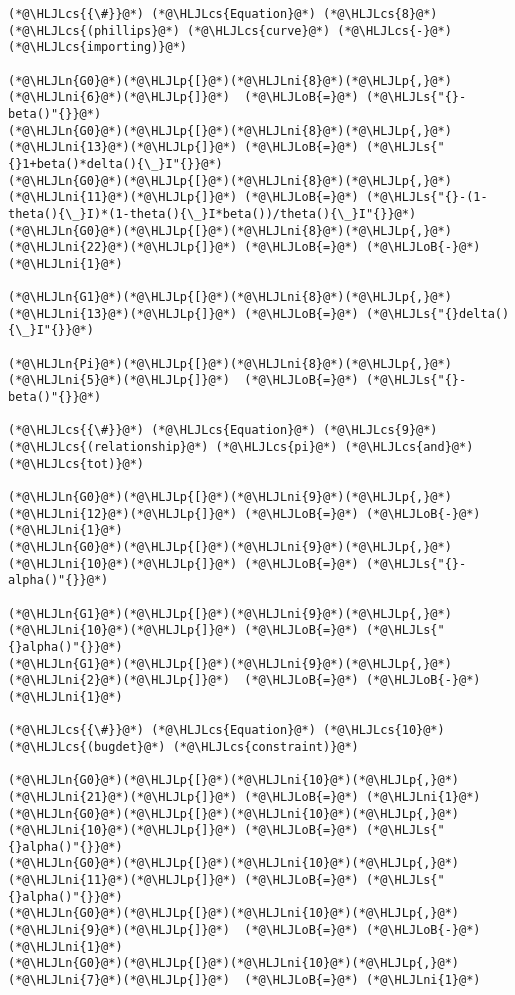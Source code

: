 \documentclass[12pt,a4paper]{article}
\newcommand{\HLJLn}[1]{#1}
\newcommand{\HLJLs}[1]{\textcolor[RGB]{201,61,57}{#1}}
\newcommand{\HLJLni}[1]{\textcolor[RGB]{59,151,46}{#1}}
\newcommand{\HLJLoB}[1]{\textcolor[RGB]{102,102,102}{\textbf{#1}}}
\newcommand{\HLJLp}[1]{#1}
\newcommand{\HLJLcs}[1]{\textcolor[RGB]{153,153,119}{\textit{#1}}}
\begin{document}
\begin{lstlisting}
(*@\HLJLcs{{\#}}@*) (*@\HLJLcs{Equation}@*) (*@\HLJLcs{8}@*)  (*@\HLJLcs{(phillips}@*) (*@\HLJLcs{curve}@*) (*@\HLJLcs{-}@*) (*@\HLJLcs{importing)}@*)

(*@\HLJLn{G0}@*)(*@\HLJLp{[}@*)(*@\HLJLni{8}@*)(*@\HLJLp{,}@*)(*@\HLJLni{6}@*)(*@\HLJLp{]}@*)  (*@\HLJLoB{=}@*) (*@\HLJLs{"{}-beta()"{}}@*)
(*@\HLJLn{G0}@*)(*@\HLJLp{[}@*)(*@\HLJLni{8}@*)(*@\HLJLp{,}@*)(*@\HLJLni{13}@*)(*@\HLJLp{]}@*) (*@\HLJLoB{=}@*) (*@\HLJLs{"{}1+beta()*delta(){\_}I"{}}@*)
(*@\HLJLn{G0}@*)(*@\HLJLp{[}@*)(*@\HLJLni{8}@*)(*@\HLJLp{,}@*)(*@\HLJLni{11}@*)(*@\HLJLp{]}@*) (*@\HLJLoB{=}@*) (*@\HLJLs{"{}-(1-theta(){\_}I)*(1-theta(){\_}I*beta())/theta(){\_}I"{}}@*)
(*@\HLJLn{G0}@*)(*@\HLJLp{[}@*)(*@\HLJLni{8}@*)(*@\HLJLp{,}@*)(*@\HLJLni{22}@*)(*@\HLJLp{]}@*) (*@\HLJLoB{=}@*) (*@\HLJLoB{-}@*)(*@\HLJLni{1}@*)

(*@\HLJLn{G1}@*)(*@\HLJLp{[}@*)(*@\HLJLni{8}@*)(*@\HLJLp{,}@*)(*@\HLJLni{13}@*)(*@\HLJLp{]}@*) (*@\HLJLoB{=}@*) (*@\HLJLs{"{}delta(){\_}I"{}}@*)

(*@\HLJLn{Pi}@*)(*@\HLJLp{[}@*)(*@\HLJLni{8}@*)(*@\HLJLp{,}@*)(*@\HLJLni{5}@*)(*@\HLJLp{]}@*)  (*@\HLJLoB{=}@*) (*@\HLJLs{"{}-beta()"{}}@*)

(*@\HLJLcs{{\#}}@*) (*@\HLJLcs{Equation}@*) (*@\HLJLcs{9}@*) (*@\HLJLcs{(relationship}@*) (*@\HLJLcs{pi}@*) (*@\HLJLcs{and}@*) (*@\HLJLcs{tot)}@*)

(*@\HLJLn{G0}@*)(*@\HLJLp{[}@*)(*@\HLJLni{9}@*)(*@\HLJLp{,}@*)(*@\HLJLni{12}@*)(*@\HLJLp{]}@*) (*@\HLJLoB{=}@*) (*@\HLJLoB{-}@*)(*@\HLJLni{1}@*)
(*@\HLJLn{G0}@*)(*@\HLJLp{[}@*)(*@\HLJLni{9}@*)(*@\HLJLp{,}@*)(*@\HLJLni{10}@*)(*@\HLJLp{]}@*) (*@\HLJLoB{=}@*) (*@\HLJLs{"{}-alpha()"{}}@*)

(*@\HLJLn{G1}@*)(*@\HLJLp{[}@*)(*@\HLJLni{9}@*)(*@\HLJLp{,}@*)(*@\HLJLni{10}@*)(*@\HLJLp{]}@*) (*@\HLJLoB{=}@*) (*@\HLJLs{"{}alpha()"{}}@*)
(*@\HLJLn{G1}@*)(*@\HLJLp{[}@*)(*@\HLJLni{9}@*)(*@\HLJLp{,}@*)(*@\HLJLni{2}@*)(*@\HLJLp{]}@*)  (*@\HLJLoB{=}@*) (*@\HLJLoB{-}@*)(*@\HLJLni{1}@*)

(*@\HLJLcs{{\#}}@*) (*@\HLJLcs{Equation}@*) (*@\HLJLcs{10}@*) (*@\HLJLcs{(bugdet}@*) (*@\HLJLcs{constraint)}@*)

(*@\HLJLn{G0}@*)(*@\HLJLp{[}@*)(*@\HLJLni{10}@*)(*@\HLJLp{,}@*)(*@\HLJLni{21}@*)(*@\HLJLp{]}@*) (*@\HLJLoB{=}@*) (*@\HLJLni{1}@*)
(*@\HLJLn{G0}@*)(*@\HLJLp{[}@*)(*@\HLJLni{10}@*)(*@\HLJLp{,}@*)(*@\HLJLni{10}@*)(*@\HLJLp{]}@*) (*@\HLJLoB{=}@*) (*@\HLJLs{"{}alpha()"{}}@*)
(*@\HLJLn{G0}@*)(*@\HLJLp{[}@*)(*@\HLJLni{10}@*)(*@\HLJLp{,}@*)(*@\HLJLni{11}@*)(*@\HLJLp{]}@*) (*@\HLJLoB{=}@*) (*@\HLJLs{"{}alpha()"{}}@*)
(*@\HLJLn{G0}@*)(*@\HLJLp{[}@*)(*@\HLJLni{10}@*)(*@\HLJLp{,}@*)(*@\HLJLni{9}@*)(*@\HLJLp{]}@*)  (*@\HLJLoB{=}@*) (*@\HLJLoB{-}@*)(*@\HLJLni{1}@*)
(*@\HLJLn{G0}@*)(*@\HLJLp{[}@*)(*@\HLJLni{10}@*)(*@\HLJLp{,}@*)(*@\HLJLni{7}@*)(*@\HLJLp{]}@*)  (*@\HLJLoB{=}@*) (*@\HLJLni{1}@*)


\end{lstlisting}
\end{document}
